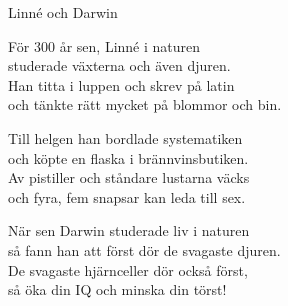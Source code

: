\begin{song}{Linné och Darwin}
	
	
	
	
	För 300 år sen, Linné i naturen\\
	studerade växterna och även djuren.\\
	Han titta i luppen och skrev på latin\\
	och tänkte rätt mycket på blommor och bin.

	Till helgen han bordlade systematiken\\
	och köpte en flaska i brännvinsbutiken.\\
	Av pistiller och ståndare lustarna väcks\\
	och fyra, fem snapsar kan leda till sex.
	
	När sen Darwin studerade liv i naturen\\
	så fann han att först dör de svagaste djuren.\\
	De svagaste hjärnceller dör också först,\\
	så öka din IQ och minska din törst!
	
\end{song}
